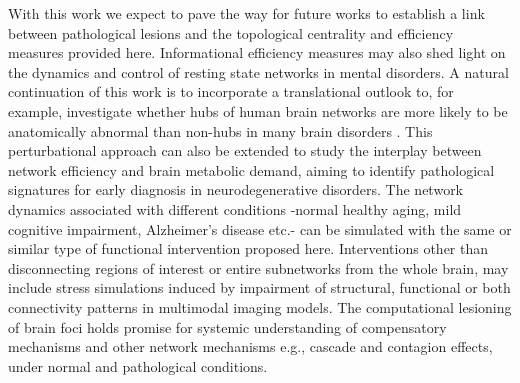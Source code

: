 \documentclass[12pt,a4paper]{article}
\begin{document}
With this work we expect to pave the way for future works to establish a link between pathological lesions and
the topological centrality and efficiency measures provided here. Informational efficiency measures may also shed light on the dynamics and control of resting state networks in mental disorders. A natural continuation of this work is to incorporate a translational outlook to, for example, investigate whether hubs of human brain networks are more likely to be anatomically abnormal than non-hubs in many brain disorders \cite{crossley_hubs_2014}.
This perturbational approach can also be extended to study the interplay between network efficiency and brain metabolic demand, aiming to identify pathological signatures for early diagnosis in neurodegenerative disorders. The network dynamics associated with different conditions -normal healthy aging, mild cognitive impairment, Alzheimer's disease etc.- can be simulated with the same or similar type of functional intervention proposed here. Interventions other than disconnecting regions of interest or entire subnetworks from the whole brain, may include stress simulations induced by impairment of structural, functional or both connectivity patterns in multimodal imaging models. The computational lesioning of brain foci holds promise for systemic understanding of compensatory mechanisms and other network mechanisms e.g., cascade and contagion effects, under normal and pathological conditions.   



%
\end{document}

